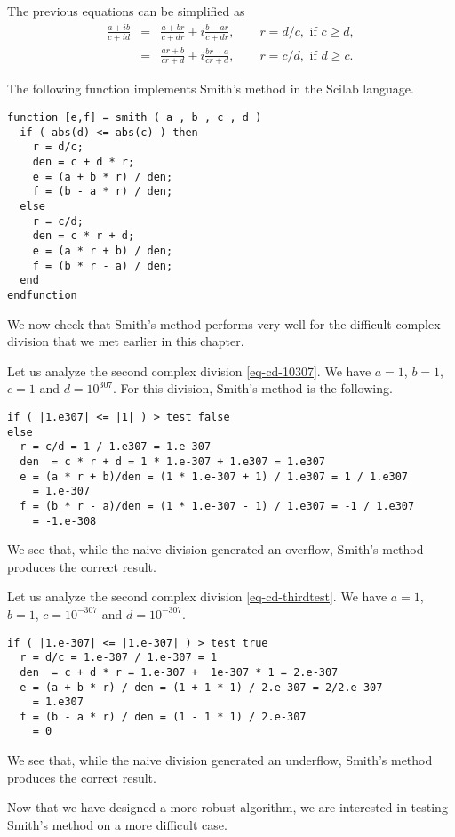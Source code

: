 The previous equations can be simplified as 
\begin{eqnarray}
\frac{a + ib}{c + id} 
&=& \frac{a + br}{c + dr} + i \frac{b - ar}{c + dr} , \qquad r = d/c, \textrm{ if } c\geq d,\\
&=& \frac{ar + b}{cr + d} + i \frac{br - a}{cr + d}, \qquad r = c/d, \textrm{ if } d\geq c.
\end{eqnarray}

The following  function implements 
Smith's method in the Scilab language.
\lstset{language=scilabscript}
\begin{lstlisting}
function [e,f] = smith ( a , b , c , d )
  if ( abs(d) <= abs(c) ) then
    r = d/c;
    den = c + d * r;
    e = (a + b * r) / den;
    f = (b - a * r) / den;
  else
    r = c/d;
    den = c * r + d;
    e = (a * r + b) / den;
    f = (b * r - a) / den;
  end
endfunction
\end{lstlisting}

We now check that Smith's method performs very well for the difficult complex 
division that we met earlier in this chapter.

Let us analyze the second complex division \ref{eq-cd-10307}.
We have $a=1$, $b=1$, $c=1$ and $d=10^{307}$.
For this division, Smith's method is the following.
\begin{lstlisting}
if ( |1.e307| <= |1| ) > test false
else
  r = c/d = 1 / 1.e307 = 1.e-307
  den  = c * r + d = 1 * 1.e-307 + 1.e307 = 1.e307
  e = (a * r + b)/den = (1 * 1.e-307 + 1) / 1.e307 = 1 / 1.e307 
    = 1.e-307
  f = (b * r - a)/den = (1 * 1.e-307 - 1) / 1.e307 = -1 / 1.e307 
    = -1.e-308
\end{lstlisting}
We see that, while the naive division generated an overflow, Smith's 
method produces the correct result.

Let us analyze the second complex division \ref{eq-cd-thirdtest}.
We have $a=1$, $b=1$, $c=10^{-307}$ and $d=10^{-307}$.
\begin{lstlisting}
if ( |1.e-307| <= |1.e-307| ) > test true
  r = d/c = 1.e-307 / 1.e-307 = 1
  den  = c + d * r = 1.e-307 +  1e-307 * 1 = 2.e-307
  e = (a + b * r) / den = (1 + 1 * 1) / 2.e-307 = 2/2.e-307 
    = 1.e307
  f = (b - a * r) / den = (1 - 1 * 1) / 2.e-307 
    = 0
\end{lstlisting}
We see that, while the naive division generated an underflow, Smith's 
method produces the correct result.

Now that we have designed a more robust algorithm, we are interested in 
testing Smith's method on a more difficult case.

